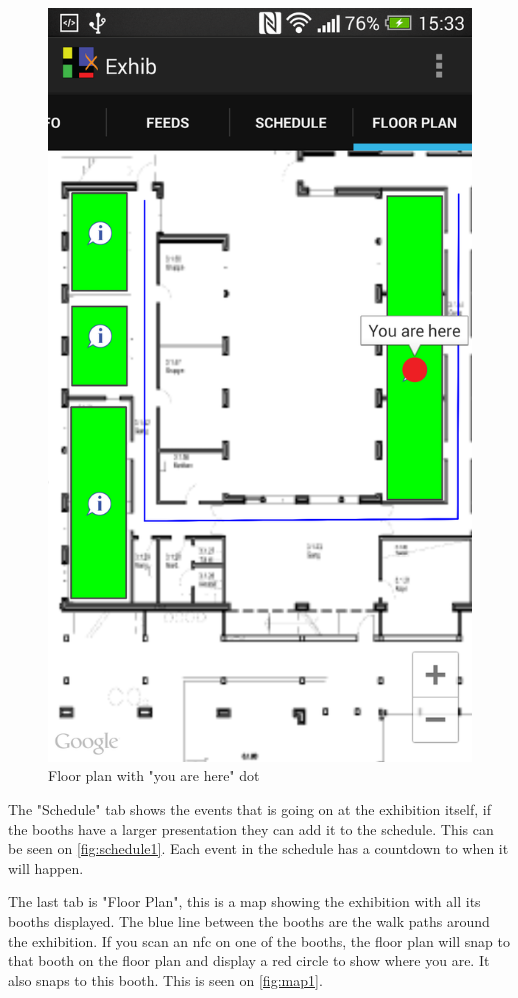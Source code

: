 \begin{figure}[H]
\begin{minipage}[b]{0.5\columnwidth}
\includegraphics[width=0.7\columnwidth]{img/finaldesign/map1.png}
\caption{Floor plan with "you are here" dot}
\label{fig:map1}
\end{minipage}
\end{figure}

The "Schedule" tab shows the events that is going on at the exhibition itself, if the booths have a larger presentation they can add it to the schedule. This can be seen on \autoref{fig:schedule1}. Each event in the schedule has a countdown to when it will happen. 

The last tab is "Floor Plan", this is a map showing the exhibition with all its booths displayed. The blue line between the booths are the walk paths around the exhibition. If you scan an \ac{nfc} on one of the booths, the floor plan will snap to that booth on the floor plan and display a red circle to show where you are. It also snaps to this booth. This is seen on \autoref{fig:map1}. 

